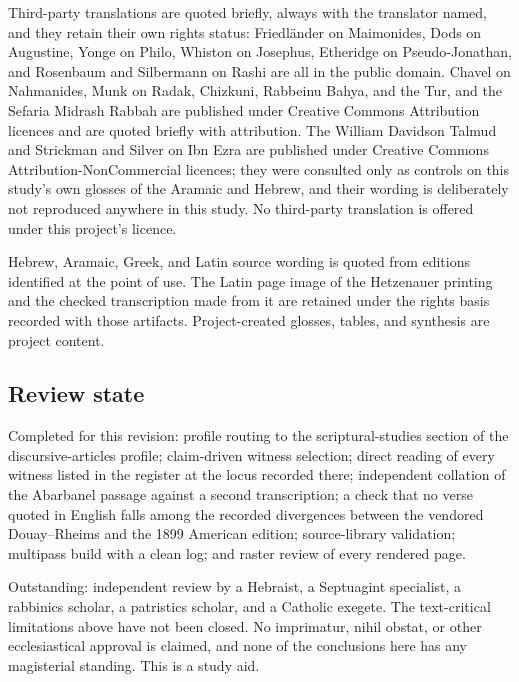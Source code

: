 Third-party translations are quoted briefly, always with the translator named,
and they retain their own rights status: Friedl\"ander on Maimonides, Dods on
Augustine, Yonge on Philo, Whiston on Josephus, Etheridge on Pseudo-Jonathan,
and Rosenbaum and Silbermann on Rashi are all in the public domain. Chavel on
Nahmanides, Munk on Radak, Chizkuni, Rabbeinu Bahya, and the Tur, and the
Sefaria Midrash Rabbah are published under Creative Commons Attribution licences
and are quoted briefly with attribution. The William Davidson Talmud and
Strickman and Silver on Ibn Ezra are published under Creative Commons
Attribution-NonCommercial licences; they were consulted only as controls on this
study's own glosses of the Aramaic and Hebrew, and their wording is deliberately
not reproduced anywhere in this study. No third-party translation is offered
under this project's licence.

Hebrew, Aramaic, Greek, and Latin source wording is quoted from editions
identified at the point of use. The Latin page image of the Hetzenauer printing
and the checked transcription made from it are retained under the rights basis
recorded with those artifacts. Project-created glosses, tables, and synthesis are
project content.

\subsection{Review state}

Completed for this revision: profile routing to the scriptural-studies section of
the discursive-articles profile; claim-driven witness selection; direct reading
of every witness listed in the register at the locus recorded there; independent
collation of the Abarbanel passage against a second transcription; a check that
no verse quoted in English falls among the recorded divergences between the
vendored Douay--Rheims and the 1899 American edition; source-library validation;
multipass build with a clean log; and raster review of every rendered page.

Outstanding: independent review by a Hebraist, a Septuagint specialist, a
rabbinics scholar, a patristics scholar, and a Catholic exegete. The
text-critical limitations above have not been closed. No imprimatur, nihil
obstat, or other ecclesiastical approval is claimed, and none of the conclusions
here has any magisterial standing. This is a study aid.
